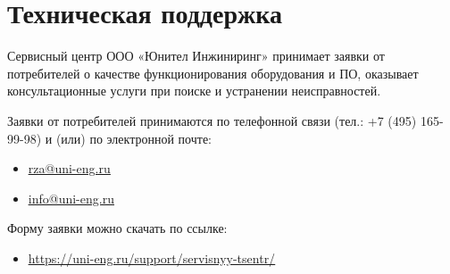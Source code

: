 {\color{unimain}\section[Техническая поддержка]{Техническая поддержка}\label{sec:support}}

Сервисный центр ООО «Юнител Инжиниринг» принимает заявки от потребителей о качестве функционирования оборудования и ПО, оказывает консультационные услуги при поиске и устранении неисправностей.

Заявки от потребителей принимаются по телефонной связи (тел.: +7 (495) 165-99-98) и (или) по электронной почте:
\begin{itemize}
	\item \href{mailto:rza@uni-eng.ru}{\color{unimain}\uline{rza@uni-eng.ru}}
	\item \href{mailto:info@uni-eng.ru}{\color{unimain}\uline{info@uni-eng.ru}}
\end{itemize}

Форму заявки можно скачать по ссылке:
\begin{itemize}
	\item \href{https://uni-eng.ru/support/servisnyy-tsentr/}{\color{unimain}\uline{https://uni-eng.ru/support/servisnyy-tsentr/}}
\end{itemize}